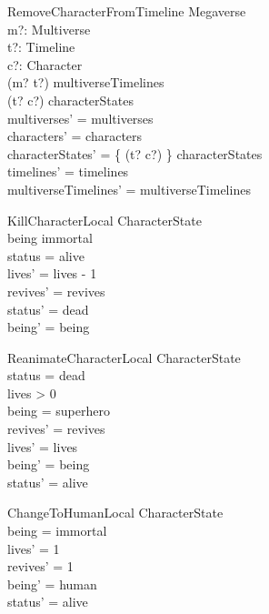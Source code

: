 \documentclass{article}
\begin{document}
\begin{schema}{RemoveCharacterFromTimeline}
\Delta Megaverse \\
m?: Multiverse \\
t?: Timeline \\
c?: Character \\
\where
(m? \mapsto t?) \in multiverseTimelines \\
(t? \mapsto c?) \in \dom characterStates  \\
multiverses' = multiverses \\
characters' = characters \\
characterStates' = \{ (t? \mapsto c?) \} \ndres characterStates \\ 
timelines' = timelines \\
multiverseTimelines' = multiverseTimelines \\
\end{schema}

\begin{schema}{KillCharacterLocal} 
\Delta CharacterState \\
\where
being \neq immortal \\
status = alive \\
lives' = lives - 1 \\
revives' = revives \\
status' = dead \\
being' = being \\
\end{schema}

\begin{schema}{ReanimateCharacterLocal}
\Delta CharacterState \\
\where
status = dead \\
lives > 0 \\
being = superhero \\
revives' = revives \\
lives' = lives \\
being' = being \\
status' = alive \\
\end{schema}

\begin{schema}{ChangeToHumanLocal}
\Delta CharacterState \\
\where
being = immortal \\
lives' = 1 \\
revives' = 1 \\
being' = human \\
status' = alive \\
\end{schema}
\end{document}
